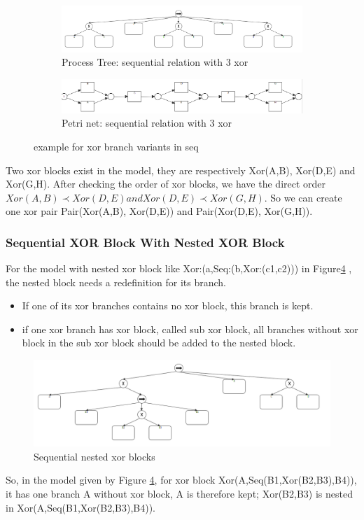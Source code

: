 \documentclass[]{article}
\begin{document}
\begin{figure}[h]
	\centering
	\begin{subfigure}[b]{\textwidth}
		\centering
		\includegraphics[width=\linewidth]{PT06_Seq_3_xor_notnested.png}
		\caption{Process Tree: sequential relation with 3 xor}
		\label{fig:pt_seq_2_xor}
	\end{subfigure}
	\vfill
	\begin{subfigure}[b]{\textwidth}
		\centering
		\includegraphics[width=\linewidth]{PN06_Seq_3_xor_notnested.png}
		\caption{Petri net: sequential relation with 3 xor}
		\label{fig:pn_seq_2_xor}
	\end{subfigure}
	\caption{example for xor branch variants in seq}
	\label{fig:seq_situation}
\end{figure}
Two xor blocks exist in the model, they are respectively Xor(A,B), Xor(D,E) and Xor(G,H). After checking the order of xor blocks, we have the direct order $Xor(A,B) \prec Xor(D,E) and Xor(D,E) \prec Xor(G,H)$. So we can create one xor pair Pair(Xor(A,B), Xor(D,E)) and Pair(Xor(D,E), Xor(G,H)).
\subsubsection{Sequential XOR Block With Nested XOR Block}
For the model with nested xor block like Xor:(a,Seq:(b,Xor:(c1,c2))) in Figure\ref{fig:pt_seq_nested} , the nested block needs a redefinition for its branch. 
\begin{itemize}
	\item If one of its xor branches contains no xor block, this branch is kept.
	\item if one xor branch has xor block, called sub xor block, all branches without xor block in the sub xor block should be added to the nested block. 
\end{itemize}
\begin{figure}[h!]
	\includegraphics[width=\textwidth]{PT09_seq_xor_nested.png}
	\caption{Sequential nested xor blocks}
	\label{fig:pt_seq_nested}
\end{figure}
So, in the model given by Figure \ref{fig:pt_seq_nested}, for xor block  Xor(A,Seq(B1,Xor(B2,B3),B4)), it has one branch A without xor block, A is therefore kept;  Xor(B2,B3) is nested in Xor(A,Seq(B1,Xor(B2,B3),B4)). 
\end{document}
